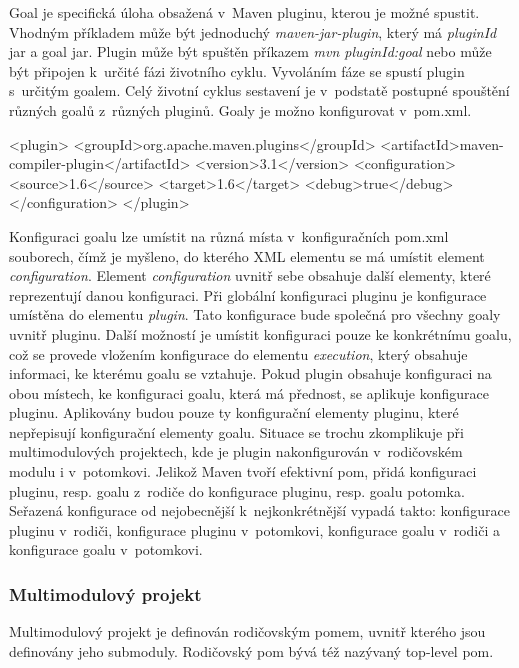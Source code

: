 \documentclass[11pt,twoside,a4paper]{book}
\begin{document}
Goal je specifická úloha obsažená v~Maven pluginu, kterou je možné spustit.
Vhodným příkladem může být jednoduchý {\em maven-jar-plugin}, který má {\em
pluginId} jar a goal jar. Plugin může být spuštěn příkazem {\em mvn
pluginId:goal} nebo může být připojen k~určité fázi životního cyklu.
Vyvoláním fáze se spustí plugin s~určitým goalem. Celý životní cyklus sestavení
je v~podstatě postupné spouštění různých goalů z~různých pluginů. Goaly je možno
konfigurovat v~pom.xml.

\begin{code}[frame=single,caption={Ukázka konfigurace v~pluginu}]
<plugin>
  <groupId>org.apache.maven.plugins</groupId>
  <artifactId>maven-compiler-plugin</artifactId>
  <version>3.1</version>
  <configuration>
    <source>1.6</source>
    <target>1.6</target>
    <debug>true</debug>
  </configuration>
</plugin>
\end{code}

Konfiguraci goalu lze umístit na různá místa v~konfiguračních pom.xml souborech,
čímž je myšleno, do kterého XML elementu se má umístit element {\em
configuration}.
Element {\em configuration} uvnitř sebe obsahuje další elementy, které
reprezentují danou konfiguraci. Při globální konfiguraci pluginu je konfigurace
umístěna do elementu {\em plugin}. Tato konfigurace bude společná pro všechny
goaly uvnitř pluginu. Další možností je umístit konfiguraci pouze ke konkrétnímu
goalu, což se provede vložením konfigurace do elementu {\em execution}, který
obsahuje informaci, ke kterému goalu se vztahuje. Pokud plugin obsahuje konfiguraci na
obou místech, ke konfiguraci goalu, která má přednost, se aplikuje konfigurace
pluginu.
Aplikovány budou pouze ty konfigurační elementy pluginu, které nepřepisují
konfigurační elementy goalu. Situace se trochu zkomplikuje při multimodulových
projektech, kde je plugin nakonfigurován v~rodičovském modulu i v~potomkovi.
Jelikož Maven tvoří efektivní pom, přidá konfiguraci pluginu, resp. goalu
z~rodiče do konfigurace pluginu, resp. goalu potomka.
Seřazená konfigurace od nejobecnější k~nejkonkrétnější vypadá takto: konfigurace
pluginu v~rodiči, konfigurace pluginu v~potomkovi, konfigurace goalu v~rodiči a
konfigurace goalu v~potomkovi.

\subsubsection{Multimodulový projekt}

Multimodulový projekt je definován rodičovským pomem, uvnitř kterého jsou definovány
jeho submoduly. Rodičovský pom bývá též nazývaný top-level pom.
\end{document}
